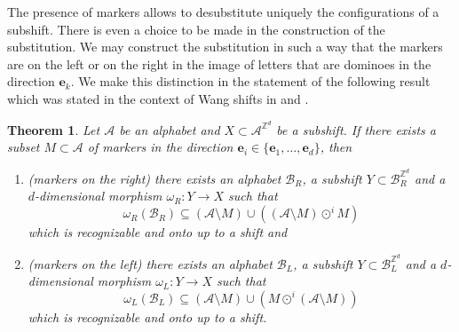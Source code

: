 \documentclass[12pt]{amsart}
\newtheorem{theorem}[definition]{Theorem}
\newcommand{\Z}{\mathbb{Z}}
\newcommand{\be}{{\boldsymbol{e}}}
\newcommand{\Acal}{\mathcal{A}} %
\newcommand{\Bcal}{\mathcal{B}}
\begin{document}
The presence of markers allows to
desubstitute uniquely the configurations of a subshift.
There is even a choice to be made in the construction of the substitution. 
We may construct the substitution in such a way that the markers are on the left or
on the right in the image of letters that are dominoes 
in the direction $\be_k$. We make this distinction in the statement of
the following result which was stated in the context of Wang shifts
in \cite{MR3978536} and \cite{MR4226493}.

\begin{theorem}\label{thm:if-markers-desubstitute}
    Let $\Acal$ be an alphabet
    and $X\subset\Acal^{\Z^d}$ be a subshift.
    If there exists a subset
    $M\subset\Acal$ 
    of markers in the direction 
    $\be_i\in\{\be_1,\dots,\be_d\}$,
    then 
\begin{enumerate}%
    \item[(i)] (markers on the right) there exists an alphabet $\Bcal_R$,
    a subshift $Y\subset\Bcal_R^{\Z^d}$
    and a $d$-dimensional morphism
    $\omega_R:Y\to X$
    such that 
    \begin{equation*}
        \omega_R(\Bcal_R)\subseteq (\Acal\setminus M)\cup 
        \left((\Acal\setminus M)\odot^i M\right)
    \end{equation*}
    which is recognizable and onto up to a shift and
\item[(ii)] (markers on the left) there exists an alphabet $\Bcal_L$,
    a subshift $Y\subset\Bcal_L^{\Z^d}$
    and a $d$-dimensional morphism
    $\omega_L:Y\to X$
    such that 
    \begin{equation*}
        \omega_L(\Bcal_L)\subseteq (\Acal\setminus M)\cup 
        \left(M\odot^i (\Acal\setminus M)\right)
    \end{equation*}
    which is recognizable and onto up to a shift.
\end{enumerate}
\end{theorem}
\end{document}
